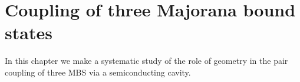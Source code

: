 \chapter{Coupling of three Majorana bound states}
In this chapter we make a systematic study of the role of geometry in the pair coupling of three MBS via a semiconducting cavity.